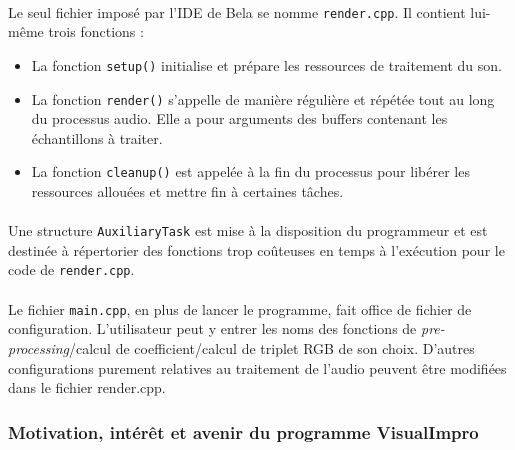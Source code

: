 \paragraph{}
Le seul fichier imposé par l'IDE de Bela se nomme \verb!render.cpp!. Il
contient lui-même trois fonctions :
\begin{itemize}
 \item La fonction \verb!setup()! initialise et prépare les ressources de
       traitement du son.
 \item La fonction \verb!render()! s'appelle de manière régulière et répétée
       tout au long du processus audio. Elle a pour arguments des buffers
       contenant les échantillons à traiter.
 \item La fonction \verb!cleanup()! est appelée à la fin du processus pour
       libérer les ressources allouées et mettre fin à certaines tâches.
\end{itemize}

\paragraph{}
Une structure \verb!AuxiliaryTask! est mise à la disposition du
programmeur et est destinée à répertorier des fonctions trop coûteuses
en temps à l'exécution pour le code de \verb!render.cpp!.

\paragraph{}
Le fichier \verb!main.cpp!, en plus de lancer le programme, fait office de
fichier de configuration. L'utilisateur peut y entrer les noms des
fonctions de \textit{pre-processing}/calcul de coefficient/calcul de
triplet RGB de son choix. D'autres configurations purement relatives
au traitement de l'audio peuvent être modifiées dans le fichier
render.cpp.

\subsubsection{Motivation, intérêt et avenir du programme VisualImpro}
